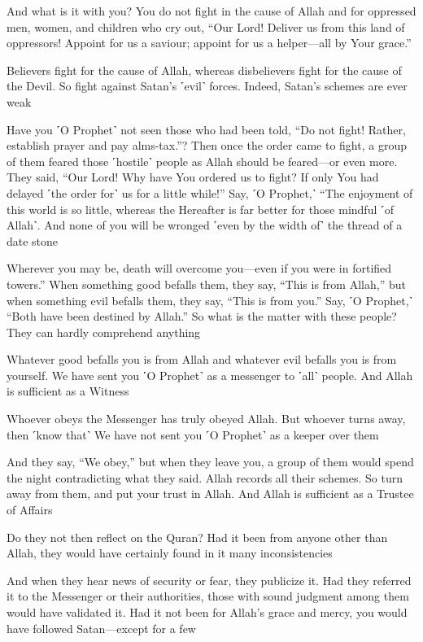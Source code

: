 And what is it with you? You do not fight in the cause of Allah and for oppressed men, women, and children who cry out, “Our Lord! Deliver us from this land of oppressors! Appoint for us a saviour; appoint for us a helper—all by Your grace.”

Believers fight for the cause of Allah, whereas disbelievers fight for the cause of the Devil. So fight against Satan’s ˹evil˺ forces. Indeed, Satan’s schemes are ever weak

Have you ˹O Prophet˺ not seen those who had been told, “Do not fight! Rather, establish prayer and pay alms-tax.”? Then once the order came to fight, a group of them feared those ˹hostile˺ people as Allah should be feared—or even more. They said, “Our Lord! Why have You ordered us to fight? If only You had delayed ˹the order for˺ us for a little while!” Say, ˹O Prophet,˺ “The enjoyment of this world is so little, whereas the Hereafter is far better for those mindful ˹of Allah˺. And none of you will be wronged ˹even by the width of˺ the thread of a date stone

Wherever you may be, death will overcome you—even if you were in fortified towers.” When something good befalls them, they say, “This is from Allah,” but when something evil befalls them, they say, “This is from you.” Say, ˹O Prophet,˺ “Both have been destined by Allah.” So what is the matter with these people? They can hardly comprehend anything

Whatever good befalls you is from Allah and whatever evil befalls you is from yourself. We have sent you ˹O Prophet˺ as a messenger to ˹all˺ people. And Allah is sufficient as a Witness

Whoever obeys the Messenger has truly obeyed Allah. But whoever turns away, then ˹know that˺ We have not sent you ˹O Prophet˺ as a keeper over them

And they say, “We obey,” but when they leave you, a group of them would spend the night contradicting what they said. Allah records all their schemes. So turn away from them, and put your trust in Allah. And Allah is sufficient as a Trustee of Affairs

Do they not then reflect on the Quran? Had it been from anyone other than Allah, they would have certainly found in it many inconsistencies

And when they hear news of security or fear, they publicize it. Had they referred it to the Messenger or their authorities, those with sound judgment among them would have validated it. Had it not been for Allah’s grace and mercy, you would have followed Satan—except for a few

